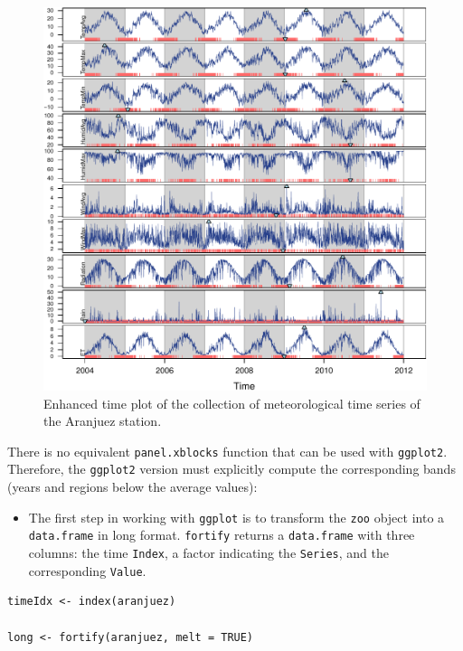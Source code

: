 \begin{figure}[htbp]
\centering
\includegraphics[width=.9\linewidth]{figs/aranjuezXblocks.pdf}
\caption{Enhanced time plot of the collection of meteorological time series of the Aranjuez station. \label{fig:aranjuezEnhanced}}
\end{figure}

There is no equivalent \texttt{panel.xblocks} function that can be used with
\texttt{ggplot2}. Therefore, the \texttt{ggplot2} version must explicitly compute
the corresponding bands (years and regions below the average values):

\begin{itemize}
\item The first step in working with \texttt{ggplot} is to transform the \texttt{zoo}
object into a \texttt{data.frame} in long format. \texttt{fortify} returns a
\texttt{data.frame} with three columns: the time \texttt{Index}, a factor
indicating the \texttt{Series}, and the corresponding \texttt{Value}.
\end{itemize}
\lstset{language=r,label= ,caption= ,captionpos=b,numbers=none}
\begin{lstlisting}
timeIdx <- index(aranjuez)
  
long <- fortify(aranjuez, melt = TRUE)
\end{lstlisting}

